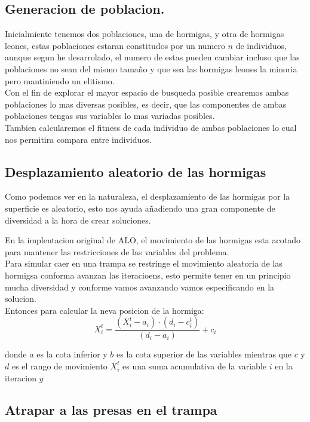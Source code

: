   \subsection{Generacion de poblacion.}
  Inicialmiente tenemos dos poblaciones, una de hormigas, y otra de hormigas leones, estas poblaciones 
  estaran constitudos por un numero $n$ de individuos, aunque segun he desarrolado, el numero de estas pueden cambiar
  incluso que las poblaciones no sean del mismo tamaño y que sea las hormigas leones la minoria pero mantiniendo un elitismo.\\
  Con el fin de explorar el mayor espacio de busqueda posible crearemos ambas poblaciones lo mas diversas 
  posibles, es decir, que las componentes de ambas poblaciones tengas sus variables lo mas variadas posibles.\\
  Tambien calcularemos el fitness de cada individuo de ambas poblaciones lo cual nos permitira compara entre individuos.

  \subsection{Desplazamiento aleatorio de las hormigas}
  Como podemos ver en la naturaleza, el desplazamiento de las hormigas por la superficie es aleatorio, esto nos ayuda 
  añadiendo una gran componente de diversidad a la hora de crear soluciones.

  En la implentacion original de ALO, el movimiento de las hormigas esta acotado para mantener las restricciones de las variables 
  del problema.\\
  Para simular caer en una trampa se restringe el movimiento aleatoria de las hormigsa conforma avanzan las iteracioens, esto permite tener en un principio mucha diversidad y conforme vamos
  avanzando vamos especificando en la solucion.\\

  Entonces para calcular la neva posicion de la hormiga: \\
  \begin{equation}
    X_i^t = \frac{(X_i^t -a_i ) \cdot (d_i -c_i^t)}{(d_i -a_i)} + c_i
  \end{equation}

  donde $a$ es la cota inferior y $b$ es la cota superior de las variables mientras que $c$ y $d$ es el rango de movimiento
  $X_i^t $ es una suma acumulativa de la variable $i$ en la iteracion $y$
  
  \subsection{Atrapar a las presas en el trampa}

